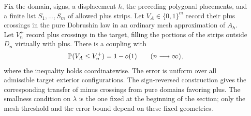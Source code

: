 \begin{proposition}
\label{prop:boundary-squeeze}
Fix the domain, signs, a displacement $h$, the preceding polygonal
placements, and a finite list $S_1,\ldots,S_m$ of allowed plus strips.
Let $V_A\in\{0,1\}^m$ record their plus crossings in the pure Dobrushin
law in an ordinary mesh approximation of $A_h$.  Let $V_n^+$ record plus
crossings in the target, filling the portions of the strips outside
$D_n$ virtually with plus.  There is a coupling with
\begin{equation}
 \P(V_A\leq V_n^+)=1-o(1) \qquad(n\longrightarrow\infty),
 \label{eq:curves-vector-order}
\end{equation}
where the inequality holds coordinatewise.  The error is uniform over
all admissible target exterior configurations.  The sign-reversed
construction gives the corresponding transfer of minus crossings from
pure domains favoring plus.  The smallness condition on $\lambda$ is the
one fixed at the beginning of the section; only the mesh threshold and
the error bound depend on these fixed geometries.
\end{proposition}


